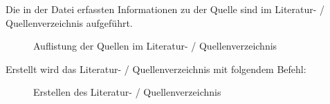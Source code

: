 
Die in der  Datei erfassten Informationen zu der Quelle sind im Literatur- / Quellenverzeichnis aufgeführt.

\begin{figure}[h!]
\centering
  \caption{Auflistung der Quellen im Literatur- / Quellenverzeichnis}
  \label{fig:QuellenVerzeichnis}
\end{figure} 

Erstellt wird das Literatur- / Quellenverzeichnis mit folgendem Befehl:

\begin{figure}[h!]
\centering
  \caption{Erstellen des Literatur- / Quellenverzeichnis}
  \label{fig:QuellenVerzeichnisErstellen}
\end{figure} 
